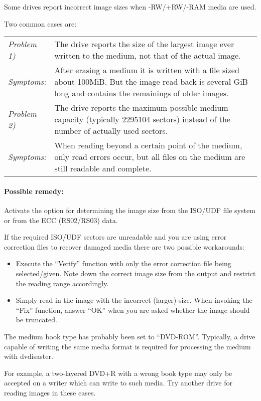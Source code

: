     {Some drives report incorrect image sizes when -RW/+RW/-RAM media are used.
    
      Two common cases are:

\smallskip

\begin{tabular}{lp{134mm}}
   {\em Problem 1)} & The drive reports the size of the largest image ever written to the medium, not that of the actual image. \\
   {\em Symptoms:} &  After erasing a medium it is written with a file sized about 100MiB. But the image read back is several GiB long and contains the remainings of older images. \\[3mm]

   {\em Problem 2)} & The drive reports the maximum possible medium capacity (typically 2295104 sectors) instead of the number of actually used sectors. \\
   {\em Symptoms:} & When reading beyond a certain point of the medium, only read errors occur, but all files on the medium are still readable and complete. \\
\end{tabular}

\paragraph{Possible remedy:} Activate the option for determining the image size from
the ISO/UDF file system or from the ECC (RS02/RS03) data.

\medskip

If the required ISO/UDF sectors are unreadable and you are using error correction
files to recover damaged media there are two possible workarounds:

\begin{itemize}
\item Execute the ``Verify'' function with only the error correction
  file being selected/given. Note down the correct image size from the
  output and restrict the reading range accordingly.
\item  Simply read in the image with the incorrect (larger) size.
  When invoking the ``Fix'' function, answer ``OK'' when you are asked
  whether the image should be truncated.
\end{itemize}}

    {The medium book type has probably been set to ``DVD-ROM''. Typically,
      a drive capable of writing the same media format is required for
      processing the medium with dvdisaster.

\smallskip
      
For example, a two-layered DVD+R with a wrong book type may only
be accepted on a writer which can write to such media. Try another
drive for reading images in these cases.}

